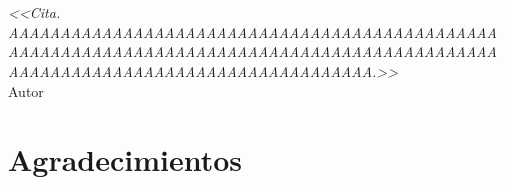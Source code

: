 \documentclass[letterpaper,spanish,12pt]{book}
\begin{document}
\frontmatter
%

\chapter*{}
\begin{flushright}
	{%
	\selectfont\emph{<<Cita. AAAAAAAAAAAAAAAAAAAAAAAAAAAAAAAAAAAAAAAAAAAAAAA AAAAAAAAAAAAAAAAAAAAAAAAAAAAAAAAAAAAAAAAAAAAAAA AAAAAAAAAAAAAAAAAAAAAAAAAAAAAAAAAAA.>>}\\
\vspace{5mm}
	Autor}

\end{flushright}
\vfill
\chapter{Agradecimientos}
\lipsum[6-9]
\tableofcontents %
\mainmatter 









\end{document}
